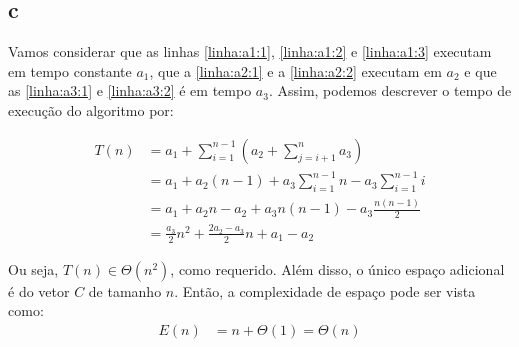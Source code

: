 \itemdsep
\subsection{c}

Vamos considerar que as linhas \ref{linha:a1:1}, \ref{linha:a1:2} e \ref{linha:a1:3} executam em tempo constante $a_1$, que a \ref{linha:a2:1} e a \ref{linha:a2:2} executam em $a_2$ e que as \ref{linha:a3:1} e \ref{linha:a3:2} é em tempo $a_3$. Assim, podemos descrever o tempo de execução do algoritmo por:

\begin{align*}
    T(n) &= a_1 + \sum_{i = 1}^{n - 1}\left(a_2 + \sum_{j = i + 1}^n a_3\right) \\
    &= a_1 + a_2 (n - 1) + a_3 \sum_{i = 1}^{n - 1} n - a_3 \sum_{i = 1}^{n - 1} i \\
    &= a_1 + a_2 n - a_2 + a_3 n (n - 1) - a_3 \frac{n (n - 1)}{2} \\
    &= \frac{a_3}{2} n^2 + \frac{2 a_2 - a_3}{2} n + a_1 - a_2
\end{align*}

Ou seja, $T(n) \in \Theta\left(n^2\right)$, como requerido. Além disso, o único espaço adicional é do vetor $C$ de tamanho $n$. Então, a complexidade de espaço pode ser vista como:
\begin{align*}
    E(n) &= n + \Theta(1) = \Theta(n)
\end{align*}
